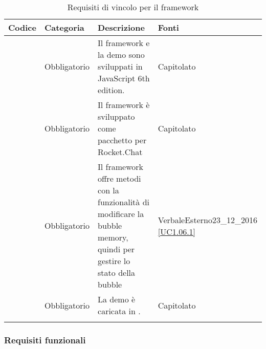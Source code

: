 \begin{longtable}{|P{1.5cm}|P{2.5cm}|P{6.5cm}|P{2.5cm}|}
	\hline \textbf{Codice} & \textbf{Categoria} & \textbf{Descrizione} & \textbf{Fonti} \\
	\hline \RequisitoObV\label{L1} & Obbligatorio & Il framework e la demo sono sviluppati in JavaScript 6th edition. & Capitolato \\
	\hline \RequisitoObV \label{L2} & Obbligatorio & Il framework è sviluppato come pacchetto per Rocket.Chat & Capitolato \\
	\hline \RequisitoObV\label{L5} & Obbligatorio & Il framework offre metodi con la funzionalità di modificare la bubble memory, quindi per gestire lo stato della bubble & VerbaleEsterno23\_12\_2016 \linebreak \ref{UC1.06.1}  \\
	\hline \RequisitoObV\label{L54} & Obbligatorio & La demo è caricata in . & Capitolato \\
	\hline
	\caption{Requisiti di vincolo per il framework}
\end{longtable}

\subsubsection{Requisiti funzionali}

